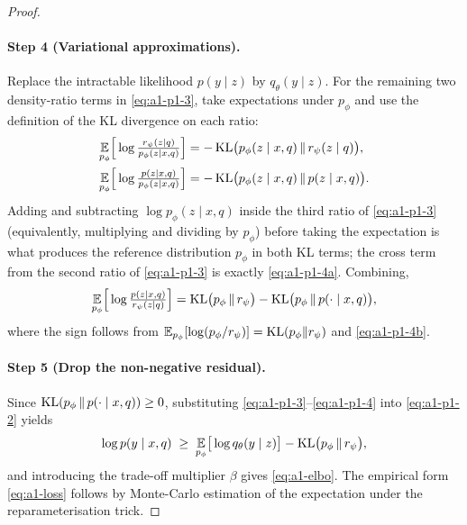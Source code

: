 \begin{proof}
\paragraph{Step 4 (Variational approximations).}
Replace the intractable likelihood $p(y\mid z)$ by $q_\theta(y\mid z)$. For the remaining two
density-ratio terms in \eqref{eq:a1-p1-3}, take expectations under $p_\phi$ and use the
definition of the KL divergence on each ratio:
\begin{align}
\operatorname*{\mathbb{E}}_{p_\phi}\!\Big[\log\tfrac{r_\psi(z\mid q)}{p_\phi(z\mid x,q)}\Big]
&= -\operatorname{KL}\!\big(p_\phi(z\mid x,q)\,\|\,r_\psi(z\mid q)\big),
\label{eq:a1-p1-4a}\\
\operatorname*{\mathbb{E}}_{p_\phi}\!\Big[\log\tfrac{p(z\mid x,q)}{p_\phi(z\mid x,q)}\Big]
&= -\operatorname{KL}\!\big(p_\phi(z\mid x,q)\,\|\,p(z\mid x,q)\big).
\label{eq:a1-p1-4b}
\end{align}
Adding and subtracting $\log p_\phi(z\mid x,q)$ inside the third ratio of \eqref{eq:a1-p1-3}
(equivalently, multiplying and dividing by $p_\phi$) before taking the expectation is what
produces the reference distribution $p_\phi$ in both KL terms; the cross term from the second
ratio of \eqref{eq:a1-p1-3} is exactly \eqref{eq:a1-p1-4a}. Combining,
\begin{equation}
\operatorname*{\mathbb{E}}_{p_\phi}\!\Big[\log\tfrac{p(z\mid x,q)}{r_\psi(z\mid q)}\Big]
= \operatorname{KL}\!\big(p_\phi\,\|\,r_\psi\big) - \operatorname{KL}\!\big(p_\phi\,\|\,p(\cdot\mid x,q)\big),
\label{eq:a1-p1-4}
\end{equation}
where the sign follows from $\operatorname*{\mathbb{E}}_{p_\phi}[\log(p_\phi/r_\psi)]=\operatorname{KL}(p_\phi\|r_\psi)$ and
\eqref{eq:a1-p1-4b}.

\paragraph{Step 5 (Drop the non-negative residual).}
Since $\operatorname{KL}(p_\phi\,\|\,p(\cdot\mid x,q))\geq 0$, substituting \eqref{eq:a1-p1-3}--\eqref{eq:a1-p1-4}
into \eqref{eq:a1-p1-2} yields
\begin{equation}
\log p(y\mid x,q) \;\geq\;
\operatorname*{\mathbb{E}}_{p_\phi}\!\big[\log q_\theta(y\mid z)\big] - \operatorname{KL}\!\big(p_\phi\,\|\,r_\psi\big),
\label{eq:a1-p1-5}
\end{equation}
and introducing the trade-off multiplier $\beta$ gives \eqref{eq:a1-elbo}. The empirical form
\eqref{eq:a1-loss} follows by Monte-Carlo estimation of the expectation under the
reparameterisation trick.
\end{proof}


